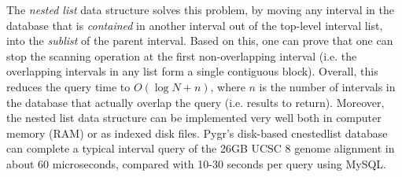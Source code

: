 \documentclass{howto}
\begin{document}
The {\em nested list} data structure solves this problem, by moving
any interval in the database that is {\em contained} in another interval
out of the top-level interval list, into the {\em sublist} of the
parent interval.  Based on this, one can prove that one can stop
the scanning operation at the first non-overlapping interval (i.e.
the overlapping intervals in any list form a single contiguous block).
Overall, this reduces the query time to $O(\log N + n)$, where $n$ is
the number of intervals in the database that actually overlap the 
query (i.e. results to return).  Moreover, the nested list data structure
can be implemented very well both in computer memory (RAM) or as indexed
disk files.  Pygr's disk-based cnestedlist database can complete
a typical interval query of the 26GB UCSC 8 genome alignment in
about 60 microseconds, compared with 10-30 seconds per query using
MySQL.
\end{document}
